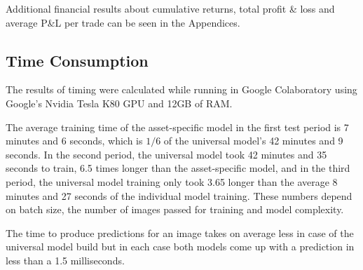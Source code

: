\documentclass[11pt, a4paper]{article}
\begin{document}
Additional financial results about cumulative returns, total profit \& loss and average P\&L per trade can be seen in the Appendices.

\subsection{Time Consumption}
\label{subsec:ER:TimePerf}

The results of timing were calculated while running in Google Colaboratory using Google's Nvidia Tesla K80 GPU and 12GB of RAM.

The average training time of the asset-specific model in the first test period is 7 minutes and 6 seconds, which is $1/6$ of the universal model's 42 minutes and 9 seconds. 
In the second period, the universal model took 42 minutes and 35 seconds to train, 6.5 times longer than the asset-specific model, and in the third period, the universal model training only took 3.65 longer than the average 8 minutes and 27 seconds of the individual model training. These numbers depend on batch size, the number of images passed for training and model complexity.

The time to produce predictions for an image takes on average less in case of the universal model build but in each case both models come up with a prediction in less than a 1.5 milliseconds.
\end{document}
